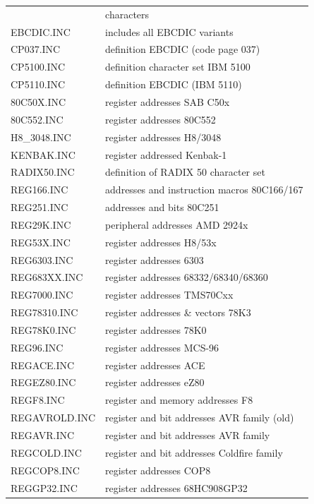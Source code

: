 \documentclass[12pt,twoside]{report}
\begin{document}
\begin{center}
\begin{longtable}{|l|l|}
                  & characters \\
EBCDIC.INC        & includes all EBCDIC variants \\
CP037.INC         & definition EBCDIC (code page 037) \\
CP5100.INC        & definition character set IBM 5100 \\
CP5110.INC        & definition EBCDIC (IBM 5110) \\
80C50X.INC        & register addresses SAB C50x \\
80C552.INC        & register addresses 80C552 \\
H8\_3048.INC      & register addresses H8/3048 \\
KENBAK.INC        & register addressed Kenbak-1 \\
RADIX50.INC       & definition of RADIX 50 character set \\
REG166.INC        & addresses and instruction macros 80C166/167 \\
REG251.INC        & addresses and bits 80C251 \\
REG29K.INC        & peripheral addresses AMD 2924x \\
REG53X.INC        & register addresses H8/53x \\
REG6303.INC       & register addresses 6303 \\
REG683XX.INC      & register addresses 68332/68340/68360 \\
REG7000.INC       & register addresses TMS70Cxx \\
REG78310.INC      & register addresses \& vectors 78K3 \\
REG78K0.INC       & register addresses 78K0 \\
REG96.INC         & register addresses MCS-96 \\
REGACE.INC        & register addresses ACE \\
REGEZ80.INC       & register addresses eZ80 \\
REGF8.INC         & register and memory addresses F8 \\
REGAVROLD.INC     & register and bit addresses AVR family (old)\\
REGAVR.INC        & register and bit addresses AVR family \\
REGCOLD.INC       & register and bit addresses Coldfire family \\
REGCOP8.INC       & register addresses COP8 \\
REGGP32.INC       & register addresses 68HC908GP32 \\

\end{longtable}
\end{center}
\end{document}
